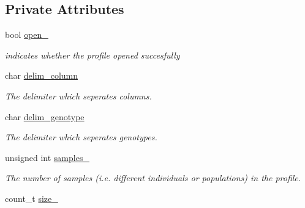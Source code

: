\subsection*{Private Attributes}
\begin{DoxyCompactItemize}
\item 
\hypertarget{classmap__file_a024dbf997a4128cf70a4d8255a85a4af}{bool \hyperlink{classmap__file_a024dbf997a4128cf70a4d8255a85a4af}{open\-\_\-}}\label{classmap__file_a024dbf997a4128cf70a4d8255a85a4af}

\begin{DoxyCompactList}\small\item\em indicates whether the profile opened succesfully \end{DoxyCompactList}\item 
\hypertarget{classmap__file_a6afbeac2a17a8ed4223678cd59fde312}{char \hyperlink{classmap__file_a6afbeac2a17a8ed4223678cd59fde312}{delim\-\_\-column}}\label{classmap__file_a6afbeac2a17a8ed4223678cd59fde312}

\begin{DoxyCompactList}\small\item\em The delimiter which seperates columns. \end{DoxyCompactList}\item 
\hypertarget{classmap__file_aa0bfa72b695cbdaf58d45deef5f7c663}{char \hyperlink{classmap__file_aa0bfa72b695cbdaf58d45deef5f7c663}{delim\-\_\-genotype}}\label{classmap__file_aa0bfa72b695cbdaf58d45deef5f7c663}

\begin{DoxyCompactList}\small\item\em The delimiter which seperates genotypes. \end{DoxyCompactList}\item 
\hypertarget{classmap__file_ace093be1b4c203e4d48016959e914a74}{unsigned int \hyperlink{classmap__file_ace093be1b4c203e4d48016959e914a74}{samples\-\_\-}}\label{classmap__file_ace093be1b4c203e4d48016959e914a74}

\begin{DoxyCompactList}\small\item\em The number of samples (i.\-e. different individuals or populations) in the profile. \end{DoxyCompactList}\item 
\hypertarget{classmap__file_a9988833c8bc5dd8e69d946f7f594c0f3}{count\-\_\-t \hyperlink{classmap__file_a9988833c8bc5dd8e69d946f7f594c0f3}{size\-\_\-}}\label{classmap__file_a9988833c8bc5dd8e69d946f7f594c0f3}


\end{DoxyCompactItemize}

